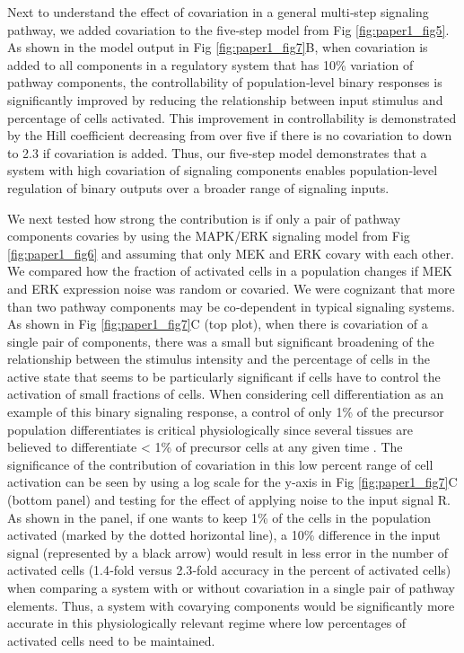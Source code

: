 Next to understand the effect of covariation in a general multi‐step signaling pathway, we added covariation to the five‐step model from Fig \ref{fig:paper1_fig5}. As shown in the model output in Fig \ref{fig:paper1_fig7}B, when covariation is added to all components in a regulatory system that has 10\% variation of pathway components, the controllability of population‐level binary responses is significantly improved by reducing the relationship between input stimulus and percentage of cells activated. This improvement in controllability is demonstrated by the Hill coefficient decreasing from over five if there is no covariation to down to 2.3 if covariation is added. Thus, our five‐step model demonstrates that a system with high covariation of signaling components enables population‐level regulation of binary outputs over a broader range of signaling inputs.

We next tested how strong the contribution is if only a pair of pathway components covaries by using the MAPK/ERK signaling model from Fig \ref{fig:paper1_fig6} and assuming that only MEK and ERK covary with each other. We compared how the fraction of activated cells in a population changes if MEK and ERK expression noise was random or covaried. We were cognizant that more than two pathway components may be co‐dependent in typical signaling systems. As shown in Fig \ref{fig:paper1_fig7}C (top plot), when there is covariation of a single pair of components, there was a small but significant broadening of the relationship between the stimulus intensity and the percentage of cells in the active state that seems to be particularly significant if cells have to control the activation of small fractions of cells. When considering cell differentiation as an example of this binary signaling response, a control of only 1\% of the precursor population differentiates is critical physiologically since several tissues are believed to differentiate < 1\% of precursor cells at any given time \cite{Spalding2008,Ahrends2014}. The significance of the contribution of covariation in this low percent range of cell activation can be seen by using a log scale for the y‐axis in Fig \ref{fig:paper1_fig7}C (bottom panel) and testing for the effect of applying noise to the input signal R. As shown in the panel, if one wants to keep 1\% of the cells in the population activated (marked by the dotted horizontal line), a 10\% difference in the input signal (represented by a black arrow) would result in less error in the number of activated cells (1.4‐fold versus 2.3‐fold accuracy in the percent of activated cells) when comparing a system with or without covariation in a single pair of pathway elements. Thus, a system with covarying components would be significantly more accurate in this physiologically relevant regime where low percentages of activated cells need to be maintained.

